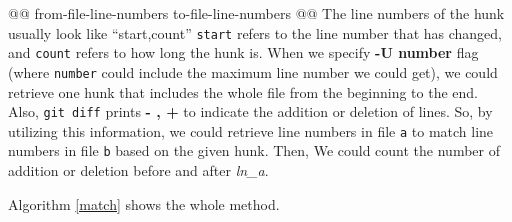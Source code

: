 @@ from-file-line-numbers to-file-line-numbers @@
The line numbers of the hunk usually look like ``start,count'' \texttt{start} refers to the line number that has changed, and \texttt{count} refers to how long the hunk is. When we specify \textbf{-U number}  flag (where \texttt{number} could include the maximum line number we could get), we could retrieve one hunk that includes the whole file from the beginning to the end.  Also, \texttt{git diff} prints \textbf{- , +} to indicate the addition or deletion of lines. So, by utilizing this information, we could retrieve line numbers in file \texttt{a} to match line numbers in file \texttt{b} based on the given hunk. Then, We could count the number of addition or deletion before and after \textit{ln\_a}.





Algorithm \ref{match}  shows the whole method.

 

